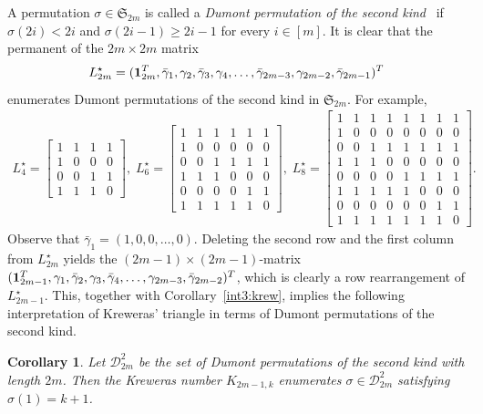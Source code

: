 \documentclass[11pt,reqno]{amsart}
\numberwithin{equation}{section}
\theoremstyle{plain}
\newtheorem{corollary}[theorem]{Corollary}
\theoremstyle{definition}
\renewcommand{\S}{\mathfrak{S}}
\begin{document}
A permutation $\sigma\in\S_{2m}$ is called a {\em Dumont permutation of the second kind}~\cite{Bur} if $\sigma(2i)<2i$ and $\sigma(2i-1)\geq 2i-1$ for every $i\in[m]$. It is clear that the permanent of the $2m\times2m$ matrix
$$
L^{\star}_{2m}=({\bf1}^T_{2m},\bar\gamma_1,\gamma_2,\bar\gamma_3,\gamma_4,\ldots,\bar\gamma_{2m-3},\gamma_{2m-2},\bar\gamma_{2m-1})^T
$$ enumerates Dumont permutations of the second kind in $\S_{2m}$.
For example,
\begin{align*}
L^{\star}_4=\begin{bmatrix}
1&1&1&1\\
1 & 0& 0&0\\
0 & 0&1&1 \\
1 & 1 & 1&0
\end{bmatrix},
\;
L^{\star}_6=\begin{bmatrix}
1 & 1 & 1 & 1 & 1&1\\
1&0 & 0 & 0 & 0 & 0\\
0&0 & 1 & 1 & 1 & 1\\
1&1 & 1 & 0 & 0 & 0\\
0&0 & 0 & 0 & 1 & 1\\
1&1 & 1 & 1 & 1 & 0
\end{bmatrix},
\;
L^{\star}_8=\begin{bmatrix}
1&1 & 1 & 1 & 1 & 1 & 1 & 1\\
1&0& 0 & 0 & 0 & 0 & 0 & 0\\
0&0 & 1 & 1 & 1 & 1 & 1 & 1\\
1&1 & 1 & 0 & 0 & 0 & 0 & 0\\
0&0 & 0 & 0 & 1 & 1 & 1 & 1\\
1&1 & 1 & 1 & 1 & 0 & 0 & 0\\
0&0 & 0 & 0 & 0 & 0 & 1 & 1\\
1&1 & 1 & 1 & 1 & 1 & 1 & 0
\end{bmatrix}.
\end{align*}
Observe that $\bar\gamma_1=(1,0,0,\ldots,0)$.  Deleting the second row and the first column from $L^{\star}_{2m}$ yields the $(2m-1)\times(2m-1)$-matrix $({\bf1}^T_{2m-1},\gamma_1,\bar\gamma_2,\gamma_3,\bar\gamma_4,\ldots,\gamma_{2m-3},\bar\gamma_{2m-2})^T$, which is clearly a row rearrangement of $L^{\star}_{2m-1}$.
This, together with Corollary~\ref{int3:krew}, implies the following interpretation of Kreweras' triangle in terms of Dumont permutations of the second kind.

\begin{corollary}\label{int4:krew}
Let $\mathcal{D}^2_{2m}$ be the set of Dumont  permutations of the second kind with length $2m$. Then
 the Kreweras number  $K_{2m-1,k}$ enumerates $\sigma\in\mathcal{D}^2_{2m}$ satisfying $\sigma(1)=k+1$.
\end{corollary}
\end{document}
